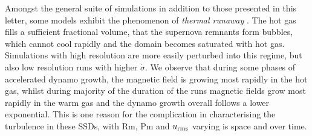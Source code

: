 \documentclass[preprint2]{aastex63}
\begin{document}


Amongst the general suite of simulations in addition to those presented in this
letter, some models exhibit the phenomenon of \emph{thermal runaway}
\citep[see e.g.,][]{LOCBN15}.
The hot gas fills a sufficient fractional volume, that the supernova remnants 
form bubbles, which cannot cool rapidly and the domain becomes saturated 
with hot gas.
Simulations with high resolution are more easily perturbed into this regime, but
also low resolution runs with higher $\dot\sigma$.
We observe that during some phases of accelerated dynamo growth, the magnetic
field is growing most rapidly in the hot gas, whilst during majority of the 
duration of the runs magnetic fields grow most rapidly in the warm gas and the
dynamo growth overall follows a lower exponential.
This is one reason for the complication in characterising the turbulence in 
these SSDs, with Rm, Pm and $u_{\rm rms}$ varying is space and over time.
\end{document}
